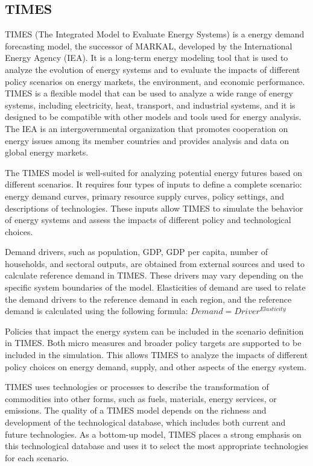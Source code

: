 \documentclass[lettersize,journal]{IEEEtran}
\begin{document}
  \subsection{TIMES}
  TIMES (The Integrated Model to Evaluate Energy Systems) is a energy demand forecasting model, the successor of MARKAL, developed by the International Energy Agency (IEA). It is a long-term energy modeling tool that is used to analyze the evolution of energy systems and to evaluate the impacts of different policy scenarios on energy markets, the environment, and economic performance. TIMES is a flexible model that can be used to analyze a wide range of energy systems, including electricity, heat, transport, and industrial systems, and it is designed to be compatible with other models and tools used for energy analysis. The IEA is an intergovernmental organization that promotes cooperation on energy issues among its member countries and provides analysis and data on global energy markets. 

  The TIMES model is well-suited for analyzing potential energy futures based on different scenarios. It requires four types of inputs to define a complete scenario: energy demand curves, primary resource supply curves, policy settings, and descriptions of technologies. These inputs allow TIMES to simulate the behavior of energy systems and assess the impacts of different policy and technological choices.

  Demand drivers, such as population, GDP, GDP per capita, number of households, and sectoral outputs, are obtained from external sources and used to calculate reference demand in TIMES. These drivers may vary depending on the specific system boundaries of the model. Elasticities of demand are used to relate the demand drivers to the reference demand in each region, and the reference demand is calculated using the following formula:
  $Demand=Driver^{Elasticity}$

  Policies that impact the energy system can be included in the scenario definition in TIMES. Both micro measures and broader policy targets are supported to be included in the simulation. This allows TIMES to analyze the impacts of different policy choices on energy demand, supply, and other aspects of the energy system.

  TIMES uses technologies or processes to describe the transformation of commodities into other forms, such as fuels, materials, energy services, or emissions. The quality of a TIMES model depends on the richness and development of the technological database, which includes both current and future technologies. As a bottom-up model, TIMES places a strong emphasis on this technological database and uses it to select the most appropriate technologies for each scenario.
\end{document}

